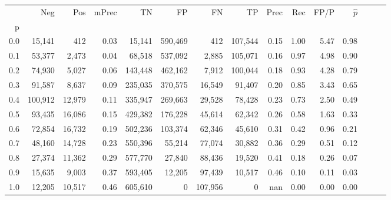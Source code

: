 \begin{tabular}{rrrrrrrrrrrrrrr}
\toprule
{} &      Neg &     Pos & mPrec &       TN &       FP &       FN &       TP &  Prec &   Rec &  FP/P & $\hat{p}$ \\
p   &          &         &       &          &          &          &          &       &       &       &           \\
\midrule
0.0 &   15,141 &     412 &  0.03 &   15,141 &  590,469 &      412 &  107,544 &  0.15 &  1.00 &  5.47 &      0.98 \\
0.1 &   53,377 &   2,473 &  0.04 &   68,518 &  537,092 &    2,885 &  105,071 &  0.16 &  0.97 &  4.98 &      0.90 \\
0.2 &   74,930 &   5,027 &  0.06 &  143,448 &  462,162 &    7,912 &  100,044 &  0.18 &  0.93 &  4.28 &      0.79 \\
0.3 &   91,587 &   8,637 &  0.09 &  235,035 &  370,575 &   16,549 &   91,407 &  0.20 &  0.85 &  3.43 &      0.65 \\
0.4 &  100,912 &  12,979 &  0.11 &  335,947 &  269,663 &   29,528 &   78,428 &  0.23 &  0.73 &  2.50 &      0.49 \\
0.5 &   93,435 &  16,086 &  0.15 &  429,382 &  176,228 &   45,614 &   62,342 &  0.26 &  0.58 &  1.63 &      0.33 \\
0.6 &   72,854 &  16,732 &  0.19 &  502,236 &  103,374 &   62,346 &   45,610 &  0.31 &  0.42 &  0.96 &      0.21 \\
0.7 &   48,160 &  14,728 &  0.23 &  550,396 &   55,214 &   77,074 &   30,882 &  0.36 &  0.29 &  0.51 &      0.12 \\
0.8 &   27,374 &  11,362 &  0.29 &  577,770 &   27,840 &   88,436 &   19,520 &  0.41 &  0.18 &  0.26 &      0.07 \\
0.9 &   15,635 &   9,003 &  0.37 &  593,405 &   12,205 &   97,439 &   10,517 &  0.46 &  0.10 &  0.11 &      0.03 \\
1.0 &   12,205 &  10,517 &  0.46 &  605,610 &        0 &  107,956 &        0 &   nan &  0.00 &  0.00 &      0.00 \\
\bottomrule
\end{tabular}

